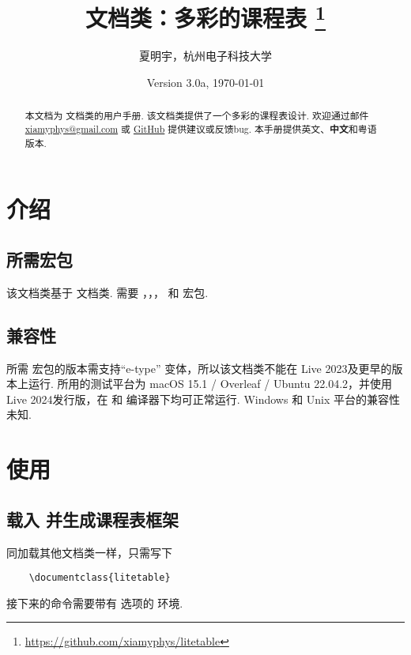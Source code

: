 \documentclass[letterpaper]{l3doc}
\title{
    \cls{litetable} 文档类：多彩的课程表
    \thanks{\url{https://github.com/xiamyphys/litetable}}
}
\author{夏明宇，杭州电子科技大学}
\affil{\href{mailto:xiamyphys@gmail.com}{xiamyphys@gmail.com}}
\date{Version 3.0a, \today}
\begin{document}
\maketitle

\begin{abstract}
    本文档为  文档类的用户手册. 该文档类提供了一个多彩的课程表设计. 欢迎通过邮件 \href{mailto:xiamyphys@gmail.com}{xiamyphys@gmail.com} 或 \href{https://github.com/xiamyphys/litetable/issues}{GitHub} 提供建议或反馈bug. 本手册提供英文、\textbf{中文}和粤语版本.
\end{abstract}

\section{介绍}

\subsection{所需宏包}

该文档类基于  文档类. 需要 ，，， 和  宏包. 

\subsection{兼容性}

所需  宏包的版本需支持``e-type'' 变体，所以该文档类不能在 Live 2023及更早的版本上运行. 所用的测试平台为 macOS 15.1 / Overleaf / Ubuntu 22.04.2，并使用 Live 2024发行版，在  和  编译器下均可正常运行. Windows 和 Unix 平台的兼容性未知.

\section{使用}

\subsection{载入  并生成课程表框架}

同加载其他文档类一样，只需写下

\begin{Verbatim}
    \documentclass{litetable}
\end{Verbatim}

接下来的命令需要带有  选项的  环境.
\end{document}
